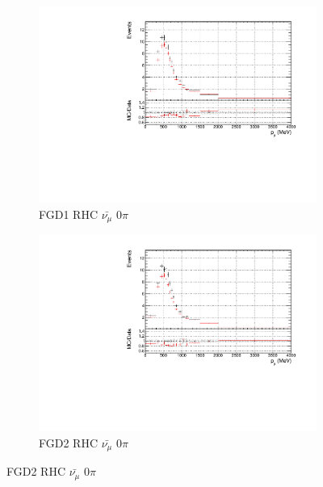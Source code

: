 \begin{figure}[!h]
\begin{subfigure}{0.49\textwidth}
  \centering
  \includegraphics[width=\textwidth]{figs/prioronly1D_p_FGD1_anti-numuCC_0pi}
  \caption{FGD1 RHC $\bar{\nu_{\mu}}$ 0$\pi$}
\end{subfigure}
\begin{subfigure}{0.49\textwidth}
  \centering
  \includegraphics[width=\textwidth]{figs/prioronly1D_p_FGD2_anti-numuCC_0pi}
  \caption{FGD2 RHC $\bar{\nu_{\mu}}$ 0$\pi$}
\end{subfigure}


\end{figure}
